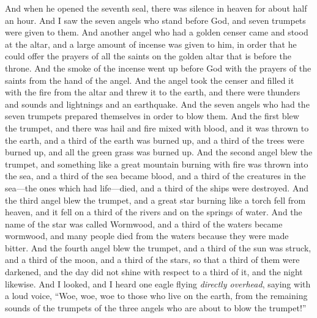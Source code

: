 \begin{biblechapter} %
 And when he opened the seventh seal, there was silence in heaven for about half an hour.
\verse And I saw the seven angels who stand before God, and seven trumpets were given to them.
\verse And another angel who had a golden censer came and stood at the altar, and a large amount of incense was given to him, in order that he could offer the prayers of all the saints on the golden altar that is before the throne.
\verse And the smoke of the incense went up before God with the prayers of the saints from the hand of the angel.
\verse And the angel took the censer and filled it with the fire from the altar and threw it to the earth, and there were thunders and sounds and lightnings and an earthquake.
 And the seven angels who had the seven trumpets prepared themselves in order to blow them.
\verse And the first blew the trumpet, and there was hail and fire mixed with blood, and it was thrown to the earth, and a third of the earth was burned up, and a third of the trees were burned up, and all the green grass was burned up.
\verse And the second angel blew the trumpet, and something like a great mountain burning with fire was thrown into the sea, and a third of the sea became blood,
\verse and a third of the creatures in the sea—the ones which had life—died, and a third of the ships were destroyed.
\verse And the third angel blew the trumpet, and a great star burning like a torch fell from heaven, and it fell on a third of the rivers and on the springs of water.
\verse And the name of the star was called Wormwood, and a third of the waters became wormwood, and many people died from the waters because they were made bitter.
\verse And the fourth angel blew the trumpet, and a third of the sun was struck, and a third of the moon, and a third of the stars, so that a third of them were darkened, and the day did not shine with respect to a third of it, and the night likewise.
\verse And I looked, and I heard one eagle flying \textit{directly overhead}, saying with a loud voice, “Woe, woe, woe to those who live on the earth, from the remaining sounds of the trumpets of the three angels who are about to blow the trumpet!”
\end{biblechapter}

